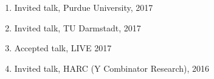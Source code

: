 \documentclass[10pt,letterpaper]{article}
\renewenvironment{itemize}{
  \begin{list}{}{
    \setlength{\leftmargin}{1.25em}
    \setlength{\itemsep}{0.25em}
    \setlength{\parskip}{0pt}
    \setlength{\parsep}{0.2em}
  }
}{
  \end{list}
}
\begin{document}
\begin{enumerate}
  \item Invited talk, Purdue University, 2017
  \item Invited talk, TU Darmstadt, 2017
  \item Accepted talk, LIVE 2017
  \item Invited talk, HARC (Y Combinator Research), 2016

\end{enumerate}
\end{document}

